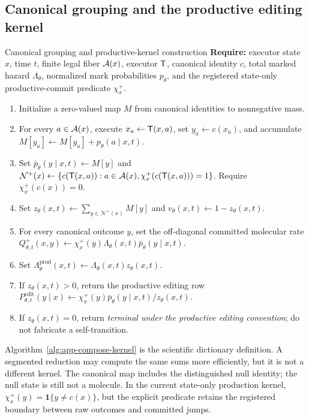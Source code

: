 \subsection{Canonical grouping and the productive editing kernel}
\label{sec:app-compose-kernel}

\begin{composeappendixalgorithm}{Canonical grouping and productive-kernel construction}
\label{alg:app-compose-kernel}
\textbf{Require:} executor state $x$, time $t$, finite legal fiber $\mathcal{A}(x)$,
executor $\mathsf{T}$, canonical identity $c$, total marked hazard
$\Lambda_\theta$, normalized mark probabilities $p_\theta$, and the
registered state-only productive-commit predicate $\chi_x^+$.
\begin{enumerate}[
  leftmargin=2.45em,
  label=\arabic*:,
  topsep=0.25em,
  itemsep=0.12em,
  parsep=0pt
]
  \item Initialize a zero-valued map $M$ from canonical identities to
  nonnegative mass.
  \item For every $a\in\mathcal{A}(x)$, execute $x_a\leftarrow\mathsf{T}(x,a)$, set
  $y_a\leftarrow c(x_a)$, and accumulate
  $M[y_a]\leftarrow M[y_a]+p_\theta(a\mid x,t)$.
  \item Set $\bar p_\theta(y\mid x,t)\leftarrow M[y]$ and
  $\mathcal N^+(x)\leftarrow
  \{c(\mathsf{T}(x,a)):a\in\mathcal{A}(x),\chi_x^+(c(\mathsf{T}(x,a)))=1\}$. Require
  $\chi_x^+(c(x))=0$.
  \item Set
  $z_\theta(x,t)\leftarrow
  \sum_{y\in\mathcal N^+(x)}M[y]$ and
  $v_\theta(x,t)\leftarrow1-z_\theta(x,t)$.
  \item For every canonical outcome $y$, set the off-diagonal committed
  molecular rate
  $Q_{\theta,t}^{+}(x,y)\leftarrow
  \chi_x^+(y)\Lambda_\theta(x,t)\bar p_\theta(y\mid x,t)$.
  \item Set
  $\Lambda_\theta^{\mathrm{prod}}(x,t)\leftarrow
  \Lambda_\theta(x,t)z_\theta(x,t)$.
  \item If $z_\theta(x,t)>0$, return the productive editing row
  $P_{\theta,t}^{\mathrm{edit}}(y\mid x)
  \leftarrow\chi_x^+(y)\bar p_\theta(y\mid x,t)/z_\theta(x,t)$.
  \item If $z_\theta(x,t)=0$, return \emph{terminal under the productive
  editing convention}; do not fabricate a self-transition.
\end{enumerate}
\end{composeappendixalgorithm}

Algorithm~\ref{alg:app-compose-kernel} is the scientific dictionary
definition.  A segmented reduction may compute the same sums more efficiently,
but it is not a different kernel.  The canonical map includes the distinguished
null identity; the null state is still not a molecule. In the current
state-only production kernel, $\chi_x^+(y)=\mathbf 1\{y\neq c(x)\}$, but the
explicit predicate retains the registered boundary between raw outcomes and
committed jumps.

